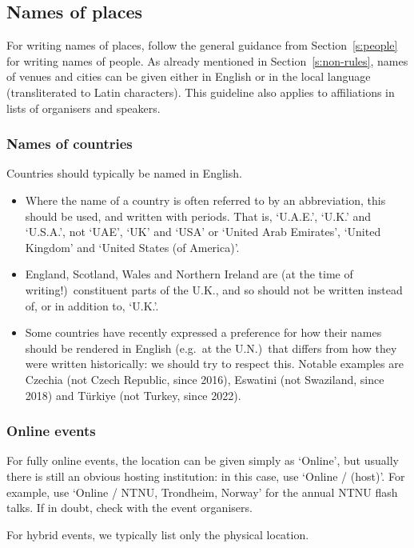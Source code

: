 \documentclass[12pt]{scrartcl}
\theoremstyle{definition}
\begin{document}
\subsection{Names of places}
\label{s:places}
For writing names of places, follow the general guidance from Section~\ref{s:people} for writing names of people.
As already mentioned in Section~\ref{s:non-rules}, names of venues and cities can be given either in English or in the local language (transliterated to Latin characters).
This guideline also applies to affiliations in lists of organisers and speakers.

\subsubsection{Names of countries}
Countries should typically be named in English.
\begin{itemize}
\item Where the name of a country is often referred to by an abbreviation, this should be used, and written with periods.
That is, `U.A.E.', `U.K.' and `U.S.A.', not `UAE', `UK' and `USA' or `United Arab Emirates', `United Kingdom' and `United States (of America)'.
\item England, Scotland, Wales and Northern Ireland are (at the time of writing!)\ constituent parts of the U.K., and so should not be written instead of, or in addition to, `U.K.'.
\item Some countries have recently expressed a preference for how their names should be rendered in English (e.g.\ at the U.N.)\ that differs from how they were written historically: we should try to respect this. Notable examples are Czechia (not Czech Republic, since 2016), Eswatini (not Swaziland, since 2018) and Türkiye (not Turkey, since 2022).
\end{itemize}

\subsubsection{Online events}
For fully online events, the location can be given simply as `Online', but usually there is still an obvious hosting institution: in this case, use `Online / (host)'. For example, use `Online / NTNU, Trondheim, Norway' for the annual NTNU flash talks.
If in doubt, check with the event organisers.

For hybrid events, we typically list only the physical location.
\end{document}
